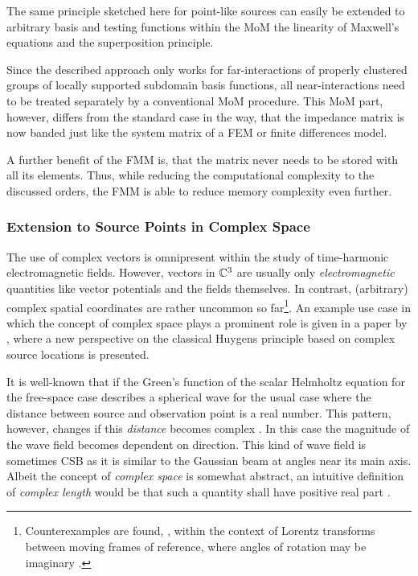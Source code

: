 The same principle sketched here for point-like sources can easily be extended
to arbitrary basis and testing functions within the \ac{MoM} the linearity of
Maxwell's equations and the superposition principle.

Since the described approach only works for far-interactions of properly
clustered groups of locally supported subdomain basis functions, all 
near-interactions need to be treated separately by a conventional
\ac{MoM} procedure.
This \ac{MoM} part, however, differs from the standard case in the way, that
the impedance matrix is now banded just like the system matrix of a \ac{FEM}
or finite differences model.

A further benefit of the \ac{FMM} is, that the matrix never needs to be stored
with all its elements.
Thus, while reducing the computational complexity to the discussed orders,
the \ac{FMM} is able to reduce memory complexity even further.







\subsubsection{Extension to Source Points in Complex Space}

The use of complex vectors \cite[Chapter~1]{Lindell2000} is omnipresent within
the study of time-harmonic electromagnetic fields.
However, vectors in $\mathbb{C}^3$ are usually only \emph{electromagnetic} quantities
like vector potentials and the fields themselves.
In contrast, (arbitrary) complex spatial coordinates are rather uncommon so
far\footnote{
	Counterexamples are found, \eg, within the context of Lorentz
	transforms between moving frames of reference, where angles of rotation may
	be imaginary \cite[Chapter~11]{Jackson2013}.
	}.
An example use case in which the concept of complex space plays a prominent role
is given in a paper by \textcite{Hansen2009}, where a new perspective on the
classical Huygens principle based on complex source locations is presented. 

It is well-known that if the Green's function of the scalar Helmholtz equation
for the free-space case describes a spherical wave for the usual case where
the distance between source and observation point is a real number.
This pattern, however, changes if this \emph{distance} becomes complex
\cite{Deschamps1971,Keller1971,Couture1981}.
In this case the magnitude of the wave field becomes dependent on direction.
This kind of wave field is sometimes \ac{CSB} as it is similar to the
Gaussian beam \cite[pp.~626]{hecht2017} at angles near its main axis.
Albeit the concept of \emph{complex space} is somewhat abstract, an intuitive
definition of \emph{complex length} would be that such a quantity shall have
positive real part \cite{Hansen2009, Hansen2013}.

